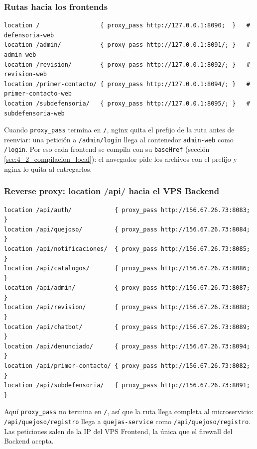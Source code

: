\subsubsection{Rutas hacia los frontends}
\begin{lstlisting}
location /                 { proxy_pass http://127.0.0.1:8090;  }   # defensoria-web
location /admin/           { proxy_pass http://127.0.0.1:8091/; }   # admin-web
location /revision/        { proxy_pass http://127.0.0.1:8092/; }   # revision-web
location /primer-contacto/ { proxy_pass http://127.0.0.1:8094/; }   # primer-contacto-web
location /subdefensoria/   { proxy_pass http://127.0.0.1:8095/; }   # subdefensoria-web
\end{lstlisting}
Cuando \texttt{proxy\_pass} termina en \texttt{/}, nginx quita el prefijo de la ruta antes de reenviar: una petición a \texttt{/admin/login} llega al contenedor \texttt{admin-web} como \texttt{/login}. Por eso cada frontend se compila con su \texttt{baseHref} (sección \ref{sec:4_2_compilacion_local}): el navegador pide los archivos con el prefijo y nginx lo quita al entregarlos.

\subsubsection{Reverse proxy: location /api/ hacia el VPS Backend}
\begin{lstlisting}
location /api/auth/            { proxy_pass http://156.67.26.73:8083; }
location /api/quejoso/         { proxy_pass http://156.67.26.73:8084; }
location /api/notificaciones/  { proxy_pass http://156.67.26.73:8085; }
location /api/catalogos/       { proxy_pass http://156.67.26.73:8086; }
location /api/admin/           { proxy_pass http://156.67.26.73:8087; }
location /api/revision/        { proxy_pass http://156.67.26.73:8088; }
location /api/chatbot/         { proxy_pass http://156.67.26.73:8089; }
location /api/denunciado/      { proxy_pass http://156.67.26.73:8094; }
location /api/primer-contacto/ { proxy_pass http://156.67.26.73:8082; }
location /api/subdefensoria/   { proxy_pass http://156.67.26.73:8091; }
\end{lstlisting}
Aquí \texttt{proxy\_pass} no termina en \texttt{/}, así que la ruta llega completa al microservicio: \texttt{/api/quejoso/registro} llega a \texttt{quejas-service} como \texttt{/api/quejoso/registro}. Las peticiones salen de la IP del VPS Frontend, la única que el firewall del Backend acepta.

